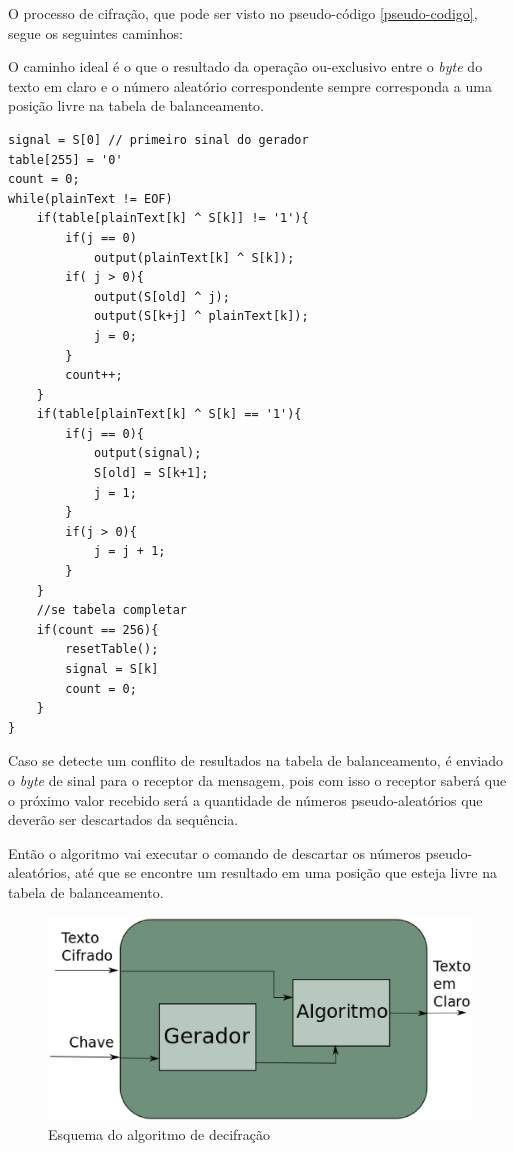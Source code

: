 O processo de cifração, que pode ser visto no pseudo-código \ref{pseudo-codigo}, segue os seguintes caminhos:


O caminho ideal é o que o resultado da operação ou-exclusivo entre o \textit{byte} do texto em claro e o número aleatório correspondente sempre corresponda a uma posição livre na tabela de balanceamento.

\begin{lstlisting}[caption={Pseudo-Código Cifração}, label=pseudo-codigo]
signal = S[0] // primeiro sinal do gerador
table[255] = '0'
count = 0;
while(plainText != EOF)
	if(table[plainText[k] ^ S[k]] != '1'){
		if(j == 0)
			output(plainText[k] ^ S[k]);
		if( j > 0){
			output(S[old] ^ j);
			output(S[k+j] ^ plainText[k]);
			j = 0;
		}
		count++;
	}
	if(table[plainText[k] ^ S[k] == '1'){
		if(j == 0){
			output(signal);
			S[old] = S[k+1];
			j = 1;		
		}
		if(j > 0){
			j = j + 1;
		}
	}
	//se tabela completar
	if(count == 256){
		resetTable();
		signal = S[k]
		count = 0;
	}
}
    \end{lstlisting}


Caso se detecte um conflito de resultados na tabela de balanceamento, é enviado o \textit{byte} de sinal para o receptor da mensagem, pois com isso o receptor saberá que o próximo valor recebido será a quantidade de números pseudo-aleatórios que deverão ser descartados da sequência. 

Então o algoritmo vai executar o comando de descartar os números pseudo-aleatórios, até que se encontre um resultado em uma posição que esteja livre na tabela de balanceamento. 


\begin{figure}[h]
	\centering
	\includegraphics[scale=0.4]{figuras/metodo_de_decifra.eps}
	\caption{Esquema do algoritmo de decifração}
\end{figure}

